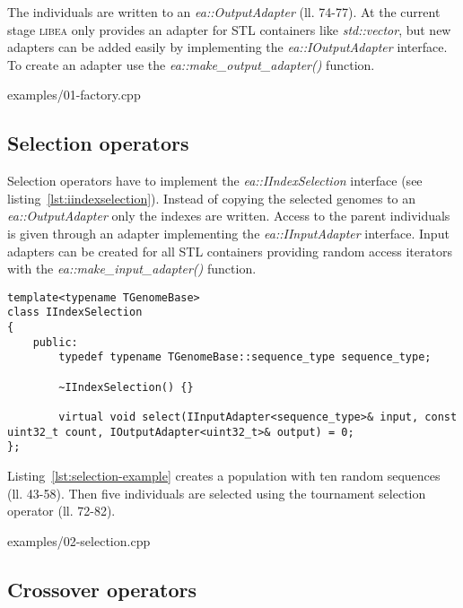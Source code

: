 \documentclass[a4paper]{article}
\begin{document}
The individuals are written to an \textit{ea::OutputAdapter} (ll. 74-77). At the current stage \textsc{libea} only provides an adapter for STL containers like \textit{std::vector}, but new adapters can be added easily by implementing the \textit{ea::IOutputAdapter} interface. To create an adapter use the \textit{ea::make\_output\_adapter()} function.

\begin{lstinputlisting}[caption=custom factory,label=lst:factory]{examples/01-factory.cpp}
\end{lstinputlisting}

\subsection{Selection operators}

Selection operators have to implement the \textit{ea::IIndexSelection} interface (see listing~\ref{lst:iindexselection}). Instead of copying the selected genomes to an \textit{ea::OutputAdapter} only the indexes are written. Access to the parent individuals is given through an adapter implementing the \textit{ea::IInputAdapter} interface. Input adapters can be created for all STL containers providing random access iterators with the \textit{ea::make\_input\_adapter()} function.

\begin{lstlisting}[caption=IIndexSelection,label=lst:iindexselection]
template<typename TGenomeBase>
class IIndexSelection
{
	public:
		typedef typename TGenomeBase::sequence_type sequence_type;

		~IIndexSelection() {}

		virtual void select(IInputAdapter<sequence_type>& input, const uint32_t count, IOutputAdapter<uint32_t>& output) = 0;
};
\end{lstlisting}

Listing~\ref{lst:selection-example} creates a population with ten random sequences (ll. 43-58). Then five individuals are selected using the tournament selection operator (ll. 72-82).

\begin{lstinputlisting}[caption=selection operators,label=lst:selection-example]{examples/02-selection.cpp}
\end{lstinputlisting}

\subsection{Crossover operators}
\end{document}
